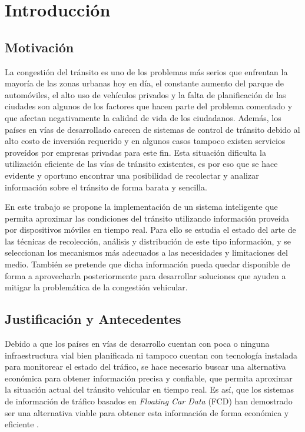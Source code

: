 \chapter{Introducción}
\label{cap:1}

\section{Motivación}

La congestión del tránsito es uno de los problemas más serios que enfrentan la mayoría de las zonas urbanas hoy en día, el constante aumento del parque de automóviles, el alto uso de vehículos privados y la falta de planificación de las ciudades son algunos de los factores que hacen parte del problema comentado y que afectan negativamente la calidad de vida de los ciudadanos. Además, los países en vías de desarrollado carecen de sistemas de control de tránsito debido al alto costo de inversión requerido y en algunos casos tampoco existen servicios proveídos por empresas privadas para este fin. Esta situación dificulta la utilización eficiente de las vías de tránsito existentes, es por eso que se hace evidente y oportuno encontrar una posibilidad de recolectar y analizar información sobre el tránsito de forma barata y sencilla.

En este trabajo se propone la implementación de un sistema inteligente que permita aproximar las condiciones del tránsito utilizando información proveída por dispositivos móviles en tiempo real. Para ello se estudia el estado del arte de las técnicas de recolección, análisis y distribución de este tipo información, y se seleccionan los mecanismos más adecuados a las necesidades y limitaciones del medio. También se pretende que dicha información pueda quedar disponible de forma a aprovecharla posteriormente para desarrollar soluciones que ayuden a mitigar la problemática de la congestión vehicular.

\section{Justificación y Antecedentes}

Debido a que los países en vías de desarrollo cuentan con poca o ninguna infraestructura vial bien planificada ni  tampoco cuentan con tecnología instalada para monitorear el estado del tráfico, se hace necesario buscar una alternativa económica para obtener información precisa y confiable, que permita aproximar la situación actual del tránsito vehicular en tiempo real. Es así, que los sistemas de información de tráfico basados en \emph{Floating Car Data} (FCD) han demostrado ser una alternativa viable para obtener esta información de forma económica y eficiente \citep{schafer2002traffic,reinthaler2007evaluation}.

